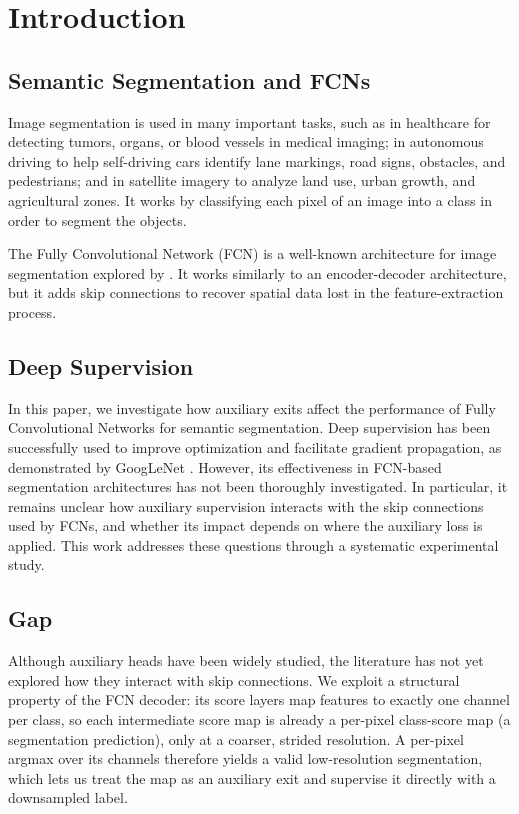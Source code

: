 \documentclass[runningheads]{llncs}
\begin{document}
\section{Introduction}


    \subsection{Semantic Segmentation and FCNs}
    
    Image segmentation is used in many important tasks, such as in healthcare for detecting tumors, organs, or blood vessels in medical imaging; in autonomous driving to help self-driving cars identify lane markings, road signs, obstacles, and pedestrians; and in satellite imagery to analyze land use, urban growth, and agricultural zones. It works by classifying each pixel of an image into a class in order to segment the objects.
    
    The Fully Convolutional Network (FCN) is a well-known architecture for image segmentation explored by \cite{ref_fcn}. It works similarly to an encoder-decoder architecture, but it adds skip connections to recover spatial data lost in the feature-extraction process.
    
    \subsection{Deep Supervision}

    In this paper, we investigate how auxiliary exits affect the performance of Fully Convolutional Networks for semantic segmentation. Deep supervision has been successfully used to improve optimization and facilitate gradient propagation, as demonstrated by GoogLeNet \cite{ref_googlenet}. However, its effectiveness in FCN-based segmentation architectures has not been thoroughly investigated. In particular, it remains unclear how auxiliary supervision interacts with the skip connections used by FCNs, and whether its impact depends on where the auxiliary loss is applied. This work addresses these questions through a systematic experimental study.
    
    
    \subsection{Gap}
    
    Although auxiliary heads have been widely studied, the literature has not yet explored how they interact with skip connections. We exploit a structural property of the FCN decoder: its score layers map features to exactly one channel per class, so each intermediate score map is already a per-pixel class-score map (a segmentation prediction), only at a coarser, strided resolution. A per-pixel argmax over its channels therefore yields a valid low-resolution segmentation, which lets us treat the map as an auxiliary exit and supervise it directly with a downsampled label.
\end{document}
